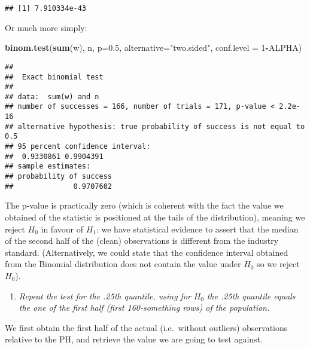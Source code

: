 \documentclass[
]{article}
\newenvironment{Shaded}{\begin{snugshade}}{\end{snugshade}}
\newcommand{\AttributeTok}[1]{\textcolor[rgb]{0.13,0.29,0.53}{#1}}
\newcommand{\DecValTok}[1]{\textcolor[rgb]{0.00,0.00,0.81}{#1}}
\newcommand{\FloatTok}[1]{\textcolor[rgb]{0.00,0.00,0.81}{#1}}
\newcommand{\FunctionTok}[1]{\textcolor[rgb]{0.13,0.29,0.53}{\textbf{#1}}}
\newcommand{\NormalTok}[1]{#1}
\newcommand{\OtherTok}[1]{\textcolor[rgb]{0.56,0.35,0.01}{#1}}
\newcommand{\SpecialCharTok}[1]{\textcolor[rgb]{0.81,0.36,0.00}{\textbf{#1}}}
\newcommand{\StringTok}[1]{\textcolor[rgb]{0.31,0.60,0.02}{#1}}
\providecommand{\tightlist}{%
  \setlength{\itemsep}{0pt}\setlength{\parskip}{0pt}}
\begin{document}
\begin{verbatim}
## [1] 7.910334e-43
\end{verbatim}

Or much more simply:

\begin{Shaded}
\begin{Highlighting}[]
\FunctionTok{binom.test}\NormalTok{(}\FunctionTok{sum}\NormalTok{(w), n, }\AttributeTok{p=}\FloatTok{0.5}\NormalTok{, }\AttributeTok{alternative=}\StringTok{"two.sided"}\NormalTok{,}
           \AttributeTok{conf.level =} \DecValTok{1}\SpecialCharTok{{-}}\NormalTok{ALPHA)}
\end{Highlighting}
\end{Shaded}

\begin{verbatim}
## 
##  Exact binomial test
## 
## data:  sum(w) and n
## number of successes = 166, number of trials = 171, p-value < 2.2e-16
## alternative hypothesis: true probability of success is not equal to 0.5
## 95 percent confidence interval:
##  0.9330861 0.9904391
## sample estimates:
## probability of success 
##              0.9707602
\end{verbatim}

The p-value is practically zero (which is coherent with the fact the
value we obtained of the statistic is positioned at the tails of the
distribution), meaning we reject \(H_0\) in favour of \(H_1\): we have
statistical evidence to assert that the median of the second half of the
(clean) observations is different from the industry standard.
(Alternatively, we could state that the confidence interval obtained
from the Binomial distribution does not contain the value under \(H_0\)
so we reject \(H_0\)).

\begin{enumerate}
\def\labelenumi{\arabic{enumi}.}
\setcounter{enumi}{2}
\tightlist
\item
  \emph{Repeat the test for the .25th quantile, using for} \(H_0\)
  \emph{the .25th quantile equals the one of the first half (first
  160-something rows) of the population.}
\end{enumerate}

We first obtain the first half of the actual (i.e.~without outliers)
observations relative to the PH, and retrieve the value we are going to
test against.

\begin{Shaded}
\end{Shaded}
\end{document}
